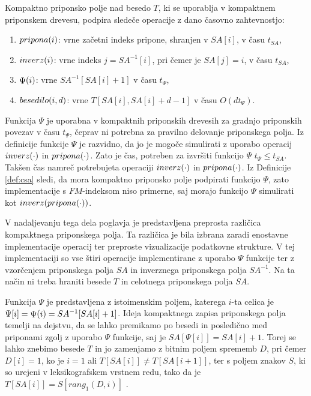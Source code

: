 \begin{defi}\label{def:csa}
     Kompaktno priponsko polje nad besedo $T$, ki se uporablja v kompaktnem priponskem drevesu, podpira sledeče operacije z dano časovno zahtevnostjo:
    \begin{enumerate}
        \item $ \mathop{pripona}(i) $: vrne začetni indeks pripone, shranjen v $SA[i]$, v času $t_{SA}$,
        \item $ \mathop{inverz}(i) $: vrne indeks $j=SA^{-1}[i]$, pri čemer je $SA[j]=i$, v času $t_{SA}$,
        \item $ \mathop{\Psi}(i) $: vrne $SA^{-1}[SA[i]+1]$ v času $t_\Psi$,
        \item $ \mathop{besedilo}(i,d) $: vrne $T[SA[i],SA[i]+d-1]$ v času $O(dt_\Psi)$.
    \end{enumerate}    
\end{defi}

Funkcija $\Psi$ je uporabna v kompaktnih priponskih drevesih za gradnjo priponskih povezav v času $t_\Psi$, čeprav ni potrebna za pravilno delovanje priponskega polja. Iz definicije funkcije $\Psi$ je razvidno, da jo je mogoče simulirati z uporabo operacij $ \mathop{inverz}(\cdot) $ in $ \mathop{pripona}(\cdot) $. Zato je čas, potreben za izvršiti funkcijo $\Psi$ $t_\Psi\le t_{SA}$. Takšen čas namreč potrebujeta operaciji $ \mathop{inverz}(\cdot) $ in $ \mathop{pripona}(\cdot) $. Iz Definicije \ref{def:csa} sledi, da mora kompaktno priponsko polje podpirati funkcijo $\Psi$, zato implementacije s $FM$-indeksom niso primerne, saj morajo funkcijo $\Psi$ simulirati kot $ \mathop{inverz}( \mathop{pripona}(\cdot) ) $.

V nadaljevanju tega dela poglavja je predstavljena preprosta različica kompaktnega priponskega polja. Ta različica je bila izbrana zaradi enostavne implementacije operacij ter preproste vizualizacije podatkovne strukture. V tej implementaciji so vse štiri operacije implementirane z uporabo $\Psi$ funkcije ter z vzorčenjem priponskega polja $SA$ in inverznega priponskega polja $SA^{-1}$. Na ta način ni treba hraniti besede $T$ in celotnega priponskega polja $SA$.

Funkcija $\Psi$ je predstavljena z istoimenskim poljem, katerega $i$-ta celica je $\Psi[i]= \mathop{\Psi}(i) =SA^{-1}[SA[i]+1]$. Ideja kompaktnega zapisa priponskega polja temelji na dejstvu, da se lahko premikamo po besedi in posledično med priponami zgolj z uporabo $\Psi$ funkcije, saj je $SA[\Psi[i]]=SA[i]+1$. Torej se lahko znebimo besede $T$ in jo zamenjamo z bitnim poljem sprememb $D$, pri čemer $D[i]=1$, ko je $i=1$ ali $T[SA[i]]\ne T[SA[i+1]]$, ter s poljem znakov $S$, ki so urejeni v leksikografskem vrstnem redu, tako da je $T[SA[i]]=S[rang_1(D,i)]$ \cite{Navarro2016}.

